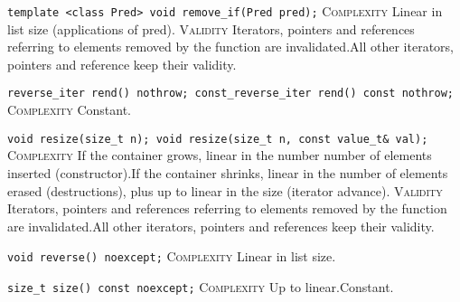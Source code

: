 \noindent{}\hspace*{0.25em}\lstinline[basicstyle=\ttfamily\color{corange}]{template <class Pred> void remove_if(Pred pred);} \textsc{Complexity} Linear in list size (applications of pred). \textsc{Validity} Iterators, pointers and references referring to elements removed by the function are invalidated.All other iterators, pointers and reference keep their validity.\\\vspace{-0.6em}

\noindent{}\hspace*{0.25em}\lstinline[basicstyle=\ttfamily\color{cgreen}]{reverse_iter rend() nothrow; const_reverse_iter rend() const nothrow;} \textsc{Complexity} Constant.\\\vspace{-0.6em}

\noindent{}\hspace*{0.25em}\lstinline[basicstyle=\ttfamily\color{corange}]{void resize(size_t n); void resize(size_t n, const value_t& val);} \textsc{Complexity} If the container grows, linear in the number number of elements inserted (constructor).If the container shrinks, linear in the number of elements erased (destructions), plus up to linear in the size (iterator advance). \textsc{Validity} Iterators, pointers and references referring to elements removed by the function are invalidated.All other iterators, pointers and references keep their validity.\\\vspace{-0.6em}

\noindent{}\hspace*{0.25em}\lstinline[basicstyle=\ttfamily\color{corange}]{void reverse() noexcept;} \textsc{Complexity} Linear in list size.\\\vspace{-0.6em}

\noindent{}\hspace*{0.25em}\lstinline[basicstyle=\ttfamily\color{corange}]{size_t size() const noexcept;} \textsc{Complexity} Up to linear.Constant.\\\vspace{-0.6em}


